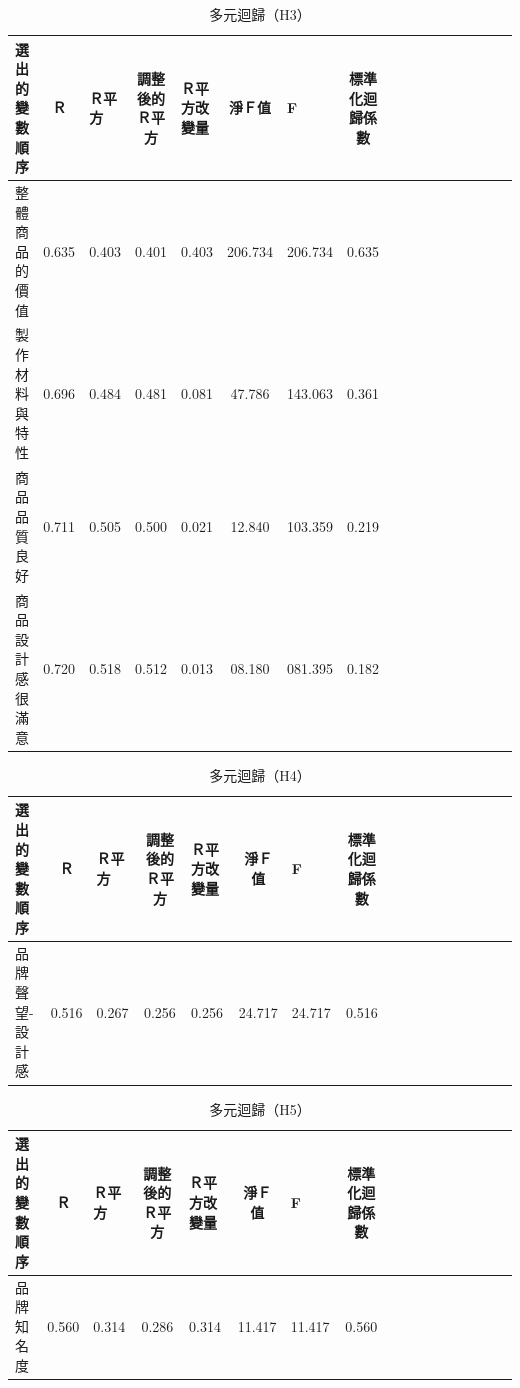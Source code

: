 \begin{table}[htb]
\caption{多元迴歸（H3）}
\label{tab:QH3}
\centering
\renewcommand{\arraystretch}{1} %
\arrayrulewidth=1pt               %
\tabcolsep=4pt                   %
\begin{tabular}[t]{lclclclclclclclcl}  %
\hline
選出的變數順序&Ｒ&Ｒ平方&調整後的Ｒ平方&Ｒ平方改變量&淨Ｆ值&F&標準化迴歸係數\\
\hline
整體商品的價值& 0.635	&0.403	&0.401	&0.403	&206.734	& 206.734 & 0.635 \\

製作材料與特性& 0.696	&0.484	&0.481	&0.081	&47.786	&143.063	&0.361 \\

商品品質良好& 0.711	&0.505	&0.500	&0.021	&12.840	&103.359	&0.219 \\

商品設計感很滿意& 0.720	&0.518	&0.512	&0.013	&08.180	&081.395 &0.182 \\
\hline
\end{tabular}
\end{table}

\begin{table}[htb]
\caption{多元迴歸（H4）}
\label{tab:QH4}
\centering
\renewcommand{\arraystretch}{1} %
\arrayrulewidth=1pt               %
\tabcolsep=4pt                   %
\begin{tabular}[t]{lclclclclclclclcl}  %
\hline
選出的變數順序&Ｒ&Ｒ平方&調整後的Ｒ平方&Ｒ平方改變量&淨Ｆ值&F&標準化迴歸係數\\
\hline
品牌聲望-設計感 &0.516 &0.267 & 0.256 & 0.256 & 24.717	& 24.717	& 0.516\\
\hline
\end{tabular}
\end{table}

\begin{table}[htb]
\caption{多元迴歸（H5）}
\label{tab:QH5}
\centering
\renewcommand{\arraystretch}{1} %
\arrayrulewidth=1pt               %
\tabcolsep=4pt                   %
\begin{tabular}[t]{lclclclclclclclcl}  %
\hline
選出的變數順序&Ｒ&Ｒ平方&調整後的Ｒ平方&Ｒ平方改變量&淨Ｆ值&F&標準化迴歸係數\\
\hline
品牌知名度 &0.560 & 0.314 & 0.286 &0.314	&11.417	&11.417	&0.560\\
\hline
\end{tabular}
\end{table}

